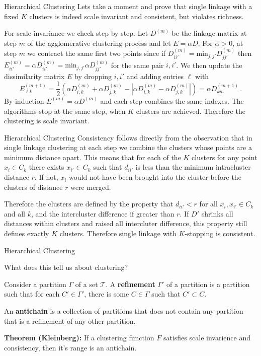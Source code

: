 \documentclass[10pt, table, dvipsnames,xcdraw,handout]{beamer}
\begin{document}
\begin{frame}[fragile]{Hierarchical Clustering}
Lets take a moment and prove that single linkage with a fixed $K$ clusters is indeed scale invariant and consistent, but violates richness.

For scale invariance we check step by step. Let $D^{(m)}$ be the linkage matrix at step $m$ of the agglomerative clustering process and let $E = \alpha D$. For $\alpha > 0$, at step $m$ we contract the same first two points since if $D_{ii'}^{(m)} = \text{min}_{j,j'} D_{jj'}^{(m)}$ then $E_{ii'}^{(m)} = \alpha D_{ii'}^{(m)} = \text{min}_{j,j'} \alpha D_{jj'}^{(m)}$ for the same pair $i,i'$. We then update the dissimilarity matrix $E$ by dropping $i,i'$ and adding entries $\ell$ with 
$$
E^{(m+1)}_{\ell k} = \frac12(\alpha D_{i,k}^{(m)} + \alpha D_{j,k}^{(m)} - |\alpha D_{i,k}^{(m)} - \alpha D_{j,k}^{(m)}|) = \alpha D_{km}^{(m+1)} \,.
$$
By induction $E^{(m)} = \alpha D^{(m)}$ and each step combines the same indexes. The algorithms stop at the same step, when $K$ clusters are achieved. Therefore the clustering is scale invariant.
\end{frame}



\begin{frame}[fragile]{Hierarchical Clustering}
Consistency follows directly from the observation that in single linkage clustering at each step we combine the clusters whose points are a minimum distance apart. This means that for each of the $K$ clusters for any point  $x_i\in C_k$ there exists $x_{i'} \in C_k$ such that $d_{ii'}$ is less than the minimum intracluster distance $r$. If not, $x_i$ would not have been brought into the cluster before the clusters of distance $r$ were merged. 

Therefore the clusters are defined by the property that $d_{ii'}<r$ for all $x_i,x_{i'}\in C_k$ and all $k$, and the intercluster difference if greater than $r$. If $D'$ shrinks all distances within clusters and raised all intercluter difference, this property still defines exactly $K$ clusters. Therefore single linkage with $K$-stopping is consistent. 
\end{frame}






\begin{frame}[fragile]{Hierarchical Clustering}

What does this tell us about clustering?

Consider a partition $\Gamma$ of a set $\mathcal{T}$. A \textbf{refinement} $\Gamma'$ of a partition is a partition such that for each $C'\in \Gamma'$, there is some $C\in \Gamma$ such that $C'\subset C$. \pause

An \textbf{antichain} is a collection of partitions that does not contain any partition that is a refinement of any other partition. 

\textbf{Theorem (Kleinberg):} If a clustering function $F$ satisfies scale invarience and consistency, then it's range is an antichain. 

\end{frame}
\end{document}
